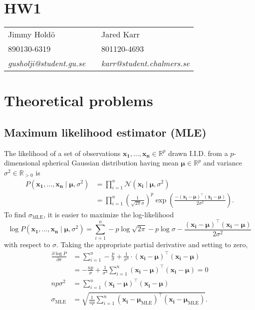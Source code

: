 \documentclass[a4paper,11pt]{article}
\DeclareMathOperator{\given}{\mid}
\begin{document}
\section*{HW1}

\begin{tabular*}{0.9\textwidth}{@{\extracolsep{\fill} } lll}
Jimmy Hold\"{o} & & Jared Karr\\
890130-6319 & & 801120-4693\\
\it{gusholji@student.gu.se} & & \it{karr@student.chalmers.se}\\
\end{tabular*}

\section{Theoretical problems}
\subsection{Maximum likelihood estimator (MLE)}
The likelihood of a set of observations $\mathbf{x_1},\dots,\mathbf{x_n}\in\mathbb{R}^p$ drawn I.I.D. from a $p$-dimensional spherical Gaussian distribution having mean $\boldsymbol\mu\in\mathbb{R}^p$ and variance $\sigma^2\in\mathbb{R}_{>0}$ is
\begin{align*}
  P(\mathbf{x_1},\dots,\mathbf{x_n}\given \boldsymbol\mu,\sigma^2)
    &=\prod_{i=1}^n\mathcal{N}(\mathbf{x_i}\given \boldsymbol\mu, \sigma^2)\\
    &=\prod_{i=1}^n\left(
        \frac{1}{\sqrt{2\pi}\sigma}
      \right)^p\exp\left(
        \frac{-(\mathbf{x_i}-\boldsymbol\mu)^\top(\mathbf{x_i}-\boldsymbol\mu)}
             {2\sigma^2}
      \right).
\end{align*}
To find $\sigma_\mathrm{\scriptscriptstyle{MLE}}$, it is easier to maximize the log-likelihood
\begin{equation*}
  \log P(\mathbf{x_1},\dots,\mathbf{x_n}\given\boldsymbol\mu,\sigma^2)
    =\sum_{i=1}^n
      -p\log\sqrt{2\pi}
      -p\log\sigma
      -\frac{(\mathbf{x_i}-\boldsymbol\mu)^\top(\mathbf{x_i}-\boldsymbol\mu)}{2\sigma^2} 
\end{equation*}
with respect to $\sigma$. Taking the appropriate partial derivative and setting to zero,
\begin{align*}
\frac{\partial\log P}{\partial\sigma}
  &=\sum_{i=1}^n
    -\frac{p}{\sigma}
    +\frac{1}{\sigma^3}\cdot(\mathbf{x_i}-\boldsymbol\mu)^\top(\mathbf{x_i}-\boldsymbol\mu)\\
  &=-\frac{np}{\sigma}
    +\frac{1}{\sigma^3}\sum_{i=1}^n(\mathbf{x_i}-\boldsymbol\mu)^\top(\mathbf{x_i}-\boldsymbol\mu)=0\\
np\sigma^2
  &=\sum_{i=1}^n(\mathbf{x_i}-\boldsymbol\mu)^\top(\mathbf{x_i}-\boldsymbol\mu)\\
\sigma_\mathrm{\scriptscriptstyle{MLE}}&=\sqrt{\frac{1}{np}\sum_{i=1}^n(\mathbf{x_i}-\boldsymbol\mu_\mathrm{\scriptscriptstyle{MLE}})^\top(\mathbf{x_i}-\boldsymbol\mu_\mathrm{\scriptscriptstyle{MLE}})}.
\end{align*}
\end{document}
